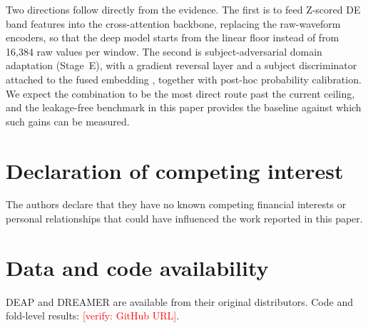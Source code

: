 \documentclass[a4paper,fleqn]{cas-sc}
\newcommand{\vrf}[1]{\textcolor{red}{[verify: #1]}}
\begin{document}
Two directions follow directly from the evidence. The first is to feed Z-scored DE band features into the cross-attention backbone, replacing the raw-waveform encoders, so that the deep model starts from the linear floor instead of from 16{,}384 raw values per window. The second is subject-adversarial domain adaptation (Stage~E), with a gradient reversal layer and a subject discriminator attached to the fused embedding \citep{ganin2016dann}, together with post-hoc probability calibration. We expect the combination to be the most direct route past the current ceiling, and the leakage-free benchmark in this paper provides the baseline against which such gains can be measured.

\section*{Declaration of competing interest}
The authors declare that they have no known competing financial interests or personal relationships that could have influenced the work reported in this paper.

\section*{Data and code availability}
DEAP and DREAMER are available from their original distributors. Code and fold-level results: \vrf{GitHub URL}.
\end{document}
